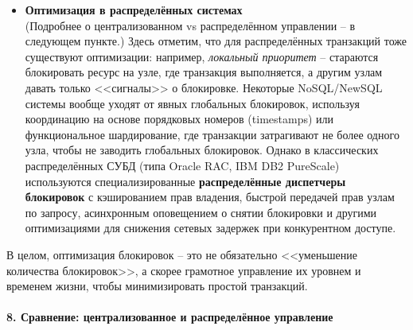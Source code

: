 \begin{itemize}
    \item \textbf{Оптимизация в распределённых системах} ~\\
    (Подробнее о централизованном vs распределённом управлении – в следующем пункте.) 
    Здесь отметим, что для распределённых транзакций тоже существуют оптимизации: например, \textit{локальный приоритет} – стараются блокировать ресурс на узле, где транзакция выполняется, а другим узлам давать только <<сигналы>> о блокировке. Некоторые NoSQL/NewSQL системы вообще уходят от явных глобальных блокировок, используя координацию на основе порядковых номеров (timestamps) или функциональное шардирование, где транзакции затрагивают не более одного узла, чтобы не заводить глобальных блокировок. Однако в классических распределённых СУБД (типа Oracle RAC, IBM DB2 PureScale) используются специализированные \textbf{распределённые диспетчеры блокировок} с кэшированием прав владения, быстрой передачей прав узлам по запросу, асинхронным оповещением о снятии блокировки и другими оптимизациями для снижения сетевых задержек при конкурентном доступе.
 \end{itemize} 

 В целом, оптимизация блокировок – это не обязательно <<уменьшение количества блокировок>>, а скорее грамотное управление их уровнем и временем жизни, чтобы минимизировать простой транзакций.

\paragraph{8. Сравнение: централизованное и распределённое управление} ~\\

